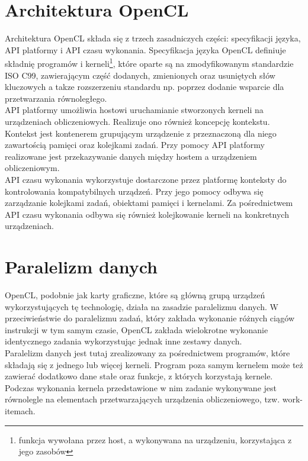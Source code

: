 \section{Architektura OpenCL}
Architektura OpenCL składa się z trzech zasadniczych części: specyfikacji języka, API platformy i API czasu wykonania. Specyfikacja języka OpenCL definiuje składnię programów i kerneli\footnote{funkcja wywołana przez host, a wykonywana na urządzeniu, korzystająca z jego zasobów}, które oparte są na zmodyfikowanym standardzie ISO C99, zawierającym część dodanych, zmienionych oraz usuniętych słów kluczowych a takze rozszerzeniu standardu np. poprzez dodanie wsparcie dla przetwarzania równoległego. \\
API platformy umożliwia hostowi uruchamianie stworzonych kerneli na urządzeniach obliczeniowych. Realizuje ono również koncepcję kontekstu. Kontekst jest kontenerem grupującym urządzenie z przeznaczoną dla niego zawartością pamięci oraz kolejkami zadań. Przy pomocy API platformy realizowane jest przekazywanie danych między hostem a urządzeniem obliczeniowym. \\
API czasu wykonania wykorzystuje dostarczone przez platformę konteksty do kontrolowania kompatybilnych urządzeń. Przy jego pomocy odbywa się zarządzanie kolejkami zadań, obiektami pamięci i kernelami. Za pośrednictwem API czasu wykonania odbywa się również kolejkowanie kerneli na konkretnych urządzeniach.

\section{Paralelizm danych}
OpenCL, podobnie jak karty graficzne, które są główną grupą urządzeń wykorzystujących tę technologię, działa na zasadzie paralelizmu danych. W przeciwieństwie do paralelizmu zadań, który zakłada wykonanie różnych ciągów instrukcji w tym samym czasie, OpenCL zakłada wielokrotne wykonanie identycznego zadania wykorzystując jednak inne zestawy danych. \\
Paralelizm danych jest tutaj zrealizowany za pośrednictwem programów, które składają się z jednego lub więcej kerneli. Program poza samym kernelem może też zawierać dodatkowo dane stałe oraz funkcje, z których korzystają kernele. Podczas wykonania kernela przedstawione w nim zadanie wykonywane jest równolegle na elementach przetwarzających urządzenia obliczeniowego, tzw. work-itemach. \\
\newpage
